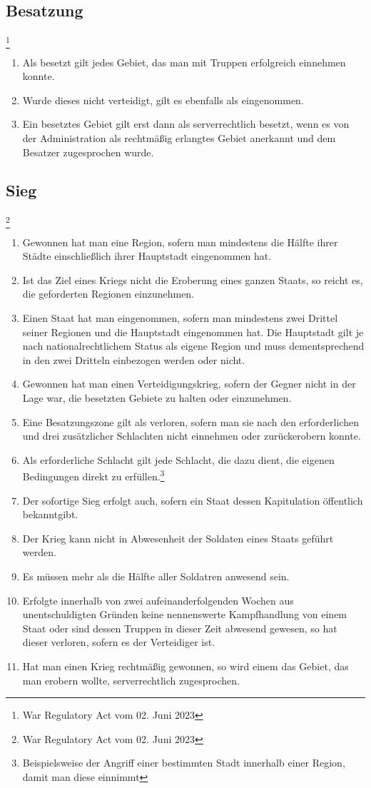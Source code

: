 \documentclass{article}
\begin{document}
\subsection{Besatzung}\footnote{War Regulatory Act vom 02. Juni 2023}
\begin{enumerate}[(1)]
	\item Als besetzt gilt jedes Gebiet, das man mit Truppen erfolgreich einnehmen konnte.
	\item Wurde dieses nicht verteidigt, gilt es ebenfalls als eingenommen.
	\item Ein besetztes Gebiet gilt erst dann als serverrechtlich besetzt, wenn es von der Administration als rechtmäßig erlangtes Gebiet anerkannt und dem Besatzer zugesprochen wurde.
\end{enumerate}

\subsection{Sieg}\footnote{War Regulatory Act vom 02. Juni 2023}
\begin{enumerate}[(1)]
	\item Gewonnen hat man eine Region, sofern man mindestens die Hälfte ihrer Städte einschließlich ihrer Hauptstadt eingenommen hat.
	\item Ist das Ziel eines Kriegs nicht die Eroberung eines ganzen Staats, so reicht es, die geforderten Regionen einzunehmen.
	\item Einen Staat hat man eingenommen, sofern man mindestens zwei Drittel seiner Regionen und die Hauptstadt eingenommen hat. Die Hauptstadt gilt je nach nationalrechtlichem Status als eigene Region und muss dementsprechend in den zwei Dritteln einbezogen werden oder nicht.
	\item Gewonnen hat man einen Verteidigungskrieg, sofern der Gegner nicht in der Lage war, die besetzten Gebiete zu halten oder einzunehmen.
	\item Eine Besatzungszone gilt als verloren, sofern man sie nach den erforderlichen und drei zusätzlicher Schlachten nicht einnehmen oder zurückerobern konnte.
	\item Als erforderliche Schlacht gilt jede Schlacht, die dazu dient, die eigenen Bedingungen direkt zu erfüllen.\footnote{Beispielsweise der Angriff einer bestimmten Stadt innerhalb einer Region, damit man diese einnimmt}
	\item Der sofortige Sieg erfolgt auch, sofern ein Staat dessen Kapitulation öffentlich bekanntgibt.
	\item Der Krieg kann nicht in Abwesenheit der Soldaten eines Staats geführt werden.
	\item Es müssen mehr als die Hälfte aller Soldatren anwesend sein.
	\item Erfolgte innerhalb von zwei aufeinanderfolgenden Wochen aus unentschuldigten Gründen keine nennenswerte Kampfhandlung von einem Staat oder sind dessen Truppen in dieser Zeit abwesend gewesen, so hat dieser verloren, sofern es der Verteidiger ist.
	\item Hat man einen Krieg rechtmäßig gewonnen, so wird einem das Gebiet, das man erobern wollte, serverrechtlich zugesprochen.
\end{enumerate}
\end{document}
